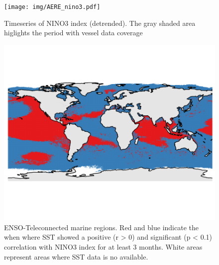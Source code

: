 \documentclass[]{article}
\begin{document}
\begin{figure}
\centering
\texttt{[image: img/AERE\_nino3.pdf]}
\caption{Timeseries of NINO3 index (detrended). The gray shaded area  higlights the period with vessel data coverage}
\end{figure}

\begin{figure}
\centering
\includegraphics{img/teleconnected_3months.pdf}
\caption{\label{fig:teleconnections} ENSO-Teleconnected marine regions.
Red and blue indicate the when where SST showed a positive (r
\textgreater{} 0) and significant (p \textless{} 0.1) correlation with
NINO3 index for at least 3 months. White areas represent areas where SST
data is no available.}
\end{figure}

\clearpage



\clearpage

\renewcommand\refname{References}

\end{document}
